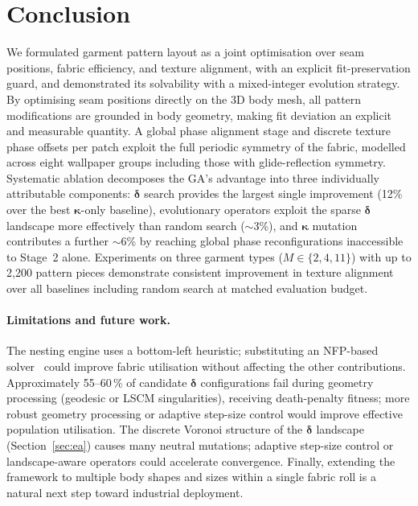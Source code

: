\section{Conclusion}
\label{sec:conclusion}

We formulated garment pattern layout as a joint optimisation over seam
positions, fabric efficiency, and texture alignment, with an explicit
fit-preservation guard, and demonstrated its solvability with a
mixed-integer evolution strategy.
By optimising seam positions directly on the 3D body mesh, all pattern
modifications are grounded in body geometry, making fit deviation an
explicit and measurable quantity.
A global phase alignment stage and discrete texture phase offsets per patch
exploit the full periodic symmetry of the fabric, modelled across eight
wallpaper groups including those with glide-reflection symmetry.
Systematic ablation decomposes the GA's advantage into three individually
attributable components: $\boldsymbol{\delta}$ search provides the
largest single improvement (12\% over the best $\boldsymbol{\kappa}$-only
baseline), evolutionary operators exploit the sparse
$\boldsymbol{\delta}$ landscape more effectively than random search
(${\sim}$3\%), and $\boldsymbol{\kappa}$ mutation contributes a further
${\sim}$6\% by reaching global phase reconfigurations inaccessible to
Stage~2 alone.
Experiments on three garment types ($M \in \{2, 4, 11\}$) with up to
2{,}200 pattern pieces demonstrate consistent improvement in texture
alignment over all baselines including random search at matched
evaluation budget.

\paragraph{Limitations and future work.}
The nesting engine uses a bottom-left heuristic; substituting an
NFP-based solver~\cite{MartinezSykoraACRO22} could improve fabric
utilisation without affecting the other contributions.
Approximately 55--60\,\% of candidate $\boldsymbol{\delta}$ configurations
fail during geometry processing (geodesic or LSCM singularities),
receiving death-penalty fitness; more robust geometry processing or
adaptive step-size control would improve effective population utilisation.
The discrete Voronoi structure of the $\boldsymbol{\delta}$ landscape
(Section~\ref{sec:ea}) causes many neutral mutations; adaptive step-size
control or landscape-aware operators could accelerate convergence.
Finally, extending the framework to multiple body shapes and sizes within
a single fabric roll is a natural next step toward industrial deployment.
